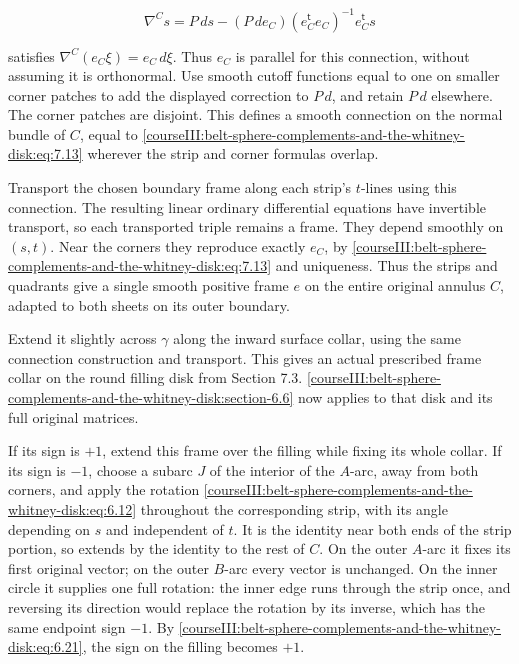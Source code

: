 \begin{equation}
\nabla^C s
=P\,ds-(P\,de_C)(e_C^{\mathsf t}e_C)^{-1}e_C^{\mathsf t}s
\label{courseIII:belt-sphere-complements-and-the-whitney-disk:eq:7.13}
\end{equation}

satisfies \(\nabla^C(e_C\xi)=e_C\,d\xi\). Thus \(e_C\) is parallel for this connection, without assuming it is orthonormal. Use smooth cutoff functions equal to one on smaller corner patches to add the displayed correction to \(P\,d\), and retain \(P\,d\) elsewhere. The corner patches are disjoint. This defines a smooth connection on the normal bundle of \(C\), equal to \eqref{courseIII:belt-sphere-complements-and-the-whitney-disk:eq:7.13} wherever the strip and corner formulas overlap.

Transport the chosen boundary frame along each strip's \(t\)-lines using this connection. The resulting linear ordinary differential equations have invertible transport, so each transported triple remains a frame. They depend smoothly on \((s,t)\). Near the corners they reproduce exactly \(e_C\), by \eqref{courseIII:belt-sphere-complements-and-the-whitney-disk:eq:7.13} and uniqueness. Thus the strips and quadrants give a single smooth positive frame \(e\) on the entire original annulus \(C\), adapted to both sheets on its outer boundary.

Extend it slightly across \(\gamma\) along the inward surface collar, using the same connection construction and transport. This gives an actual prescribed frame collar on the round filling disk from Section 7.3. \cref{courseIII:belt-sphere-complements-and-the-whitney-disk:section-6.6} now applies to that disk and its full original matrices.

If its sign is \(+1\), extend this frame over the filling while fixing its whole collar. If its sign is \(-1\), choose a subarc \(J\) of the interior of the \(A\)-arc, away from both corners, and apply the rotation \eqref{courseIII:belt-sphere-complements-and-the-whitney-disk:eq:6.12} throughout the corresponding strip, with its angle depending on \(s\) and independent of \(t\). It is the identity near both ends of the strip portion, so extends by the identity to the rest of \(C\). On the outer \(A\)-arc it fixes its first original vector; on the outer \(B\)-arc every vector is unchanged. On the inner circle it supplies one full rotation: the inner edge runs through the strip once, and reversing its direction would replace the rotation by its inverse, which has the same endpoint sign \(-1\). By \eqref{courseIII:belt-sphere-complements-and-the-whitney-disk:eq:6.21}, the sign on the filling becomes \(+1\).

